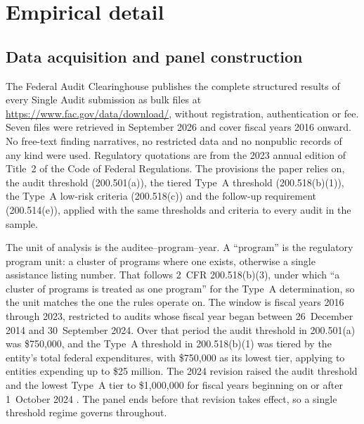 \section{Empirical detail}\label{app:emp}

\subsection{Data acquisition and panel construction}

The Federal Audit Clearinghouse publishes the complete structured results of
every Single Audit submission as bulk files at
\url{https://www.fac.gov/data/download/}, without registration,
authentication or fee. Seven files were retrieved in September 2026 and cover
fiscal years 2016 onward. No free-text finding narratives, no restricted data
and no nonpublic records of any kind were used. Regulatory quotations are
from the 2023 annual edition of Title~2 of the Code of Federal Regulations.
The provisions the paper relies on, the audit threshold (200.501(a)), the
tiered Type~A threshold (200.518(b)(1)), the Type~A low-risk criteria
(200.518(c)) and the follow-up requirement (200.514(e)), applied with the same
thresholds and criteria to every audit in the sample.

The unit of analysis is the auditee--program--year. A ``program'' is the
regulatory program unit: a cluster of programs where one exists, otherwise a
single assistance listing number. That follows 2~CFR 200.518(b)(3), under
which ``a cluster of programs is treated as one program'' for the Type~A
determination, so the unit matches the one the rules operate on. The window
is fiscal years 2016 through 2023, restricted to audits whose fiscal year began
between 26~December 2014 and 30~September 2024. Over that period the audit
threshold in 200.501(a) was \$750,000, and the Type~A threshold in
200.518(b)(1) was tiered by the entity's total federal expenditures, with
\$750,000 as its lowest tier, applying to entities expending up to \$25
million. The 2024 revision raised the audit threshold and the lowest Type~A
tier to \$1,000,000 for fiscal years beginning on or after 1~October 2024
\citep{omb2024}. The panel ends before that revision takes effect, so a
single threshold regime governs throughout.

